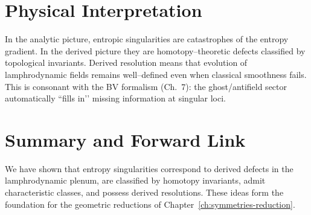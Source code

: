\section{Physical Interpretation}
\label{sec:phys-top}

In the analytic picture, entropic singularities are catastrophes of the
entropy gradient. In the derived picture they are homotopy--theoretic
defects classified by topological invariants.  Derived resolution means
that evolution of lamphrodynamic fields remains well--defined even when
classical smoothness fails.  This is consonant with the BV formalism
(Ch.~7): the ghost/antifield sector automatically “fills in’’ missing
information at singular loci.



\section{Summary and Forward Link}
\label{sec:summary12}

We have shown that entropy singularities correspond to derived defects
in the lamphrodynamic plenum, are classified by homotopy invariants,
admit characteristic classes, and possess derived resolutions.
These ideas form the foundation for the geometric reductions of
Chapter~\ref{ch:symmetries-reduction}.

